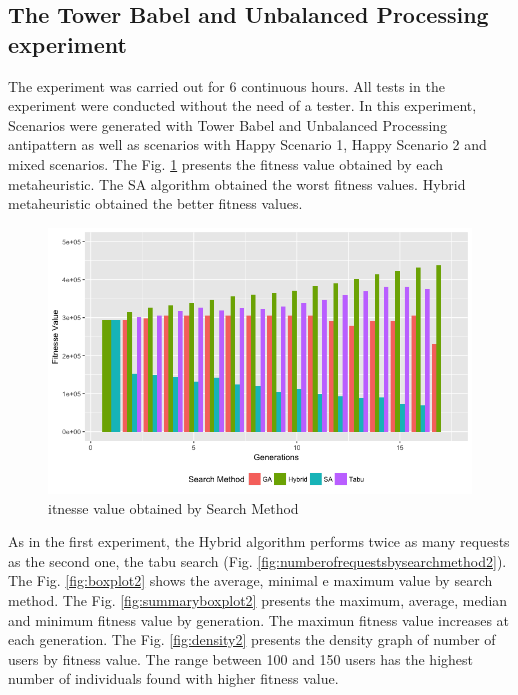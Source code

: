 \subsection{The Tower Babel  and Unbalanced Processing experiment}

The experiment was carried out for 6 continuous hours. All tests in the experiment were conducted without the need of a tester. In this experiment, Scenarios were generated with Tower Babel and Unbalanced Processing antipattern as well as scenarios with Happy Scenario 1, Happy Scenario 2 and mixed scenarios. The Fig. \ref{fig:fitnessbygeneration2}  presents the fitness value obtained by each metaheuristic. The SA algorithm obtained the worst fitness values. Hybrid metaheuristic obtained the better fitness values.


\begin{figure}[h]
\centering
\includegraphics[width=.7\textwidth]{./images/experiment2-7.png}
\caption{itnesse value obtained by Search Method}
\label{fig:fitnessbygeneration2}
\end{figure}

As in the first experiment, the Hybrid algorithm performs twice as many requests as the second one, the tabu search (Fig. \ref{fig:numberofrequestsbysearchmethod2}). The Fig. \ref{fig:boxplot2} shows the average, minimal e maximum value by search method. The Fig. \ref{fig:summaryboxplot2} presents the maximum, average, median and minimum fitness value by generation. The maximun fitness value increases at each generation. The Fig. \ref{fig:density2} presents the density graph of number of users by fitness value. The range between 100 and 150 users has the highest number of individuals found with higher fitness value.


